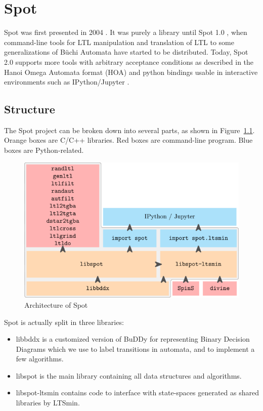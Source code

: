 \chapter{Spot}
Spot was first presented in 2004 \cite{2}. It was purely a library until Spot 1.0 \cite{1}, when
command-line tools for LTL manipulation and translation of LTL to some generalizations of Büchi Automata
have started to be distributed. Today, Spot 2.0 supports more tools with arbitrary acceptance conditions
as described in the Hanoi Omega Automata format (HOA) \cite{3} and python bindings usable in interactive
environments such as IPython/Jupyter \cite{4}.

\section{Structure}
The Spot project can be broken down into several parts, as shown in Figure~\ref{fig:arch}. Orange boxes are C/C++ libraries.
Red boxes are command-line program. Blue boxes are Python-related.
\begin{figure}[H]
 \centering
 \includegraphics[scale=0.6]{img/arch.png}
 \caption{Architecture of Spot}
 \label{fig:arch}
\end{figure}
Spot is actually split in three libraries:
\begin{itemize}
 \item libbddx is a customized version of BuDDy for representing Binary Decision Diagrams which we use to
label transitions in automata, and to implement a few algorithms.
 \item libspot is the main library containing all data structures and algorithms.
 \item libspot-ltsmin contains code to interface with state-spaces generated as shared libraries by LTSmin.
\end{itemize}


